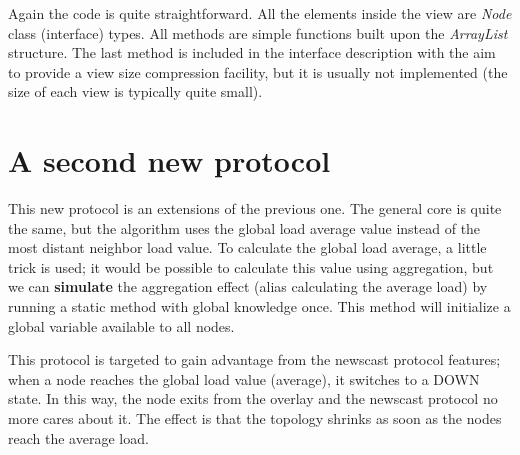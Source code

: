 \documentclass[a4paper,11pt]{article}
\begin{document}
Again the code is quite straightforward. All the elements inside the
view are \emph{Node} class (interface) types. All methods are simple
functions built upon the \emph{ArrayList} structure. The last method
is included in the interface description with the aim to provide a
view size compression facility, but it is usually not implemented (the
size of each view is typically quite small).


\section{A second new protocol}

This new protocol is an extensions of the previous one. The general
core is quite the same, but the algorithm uses the global load average
value instead of the most distant neighbor load value. To calculate
the global load average, a little trick is used; it would be possible
to calculate this value using aggregation, but we can \textbf{simulate}
the aggregation effect (alias calculating the average load) by running
a static method with global knowledge once. This method will initialize
a global variable available to all nodes. 

This protocol is targeted to gain advantage from the newscast protocol
features; when a node reaches the global load value (average), it
switches to a DOWN state. In this way, the node exits from the overlay
and the newscast protocol no more cares about it. The effect is that
the topology shrinks as soon as the nodes reach the average load.
\end{document}
